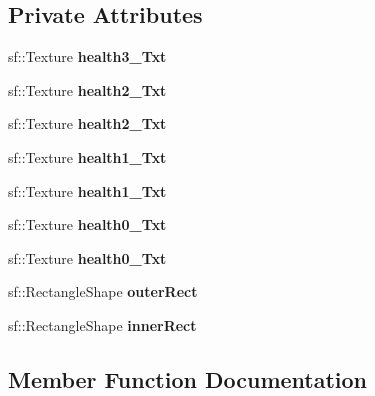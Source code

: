 \subsection*{Private Attributes}
\begin{DoxyCompactItemize}
\item 
\mbox{\label{class_health_system_a3ab0f2f933ddf8574d0814ac7d4c73fc}} 
sf\+::\+Texture {\bfseries health3\+\_\+Txt}
\item 
\mbox{\label{class_health_system_ac003fc2293955dc5b2e27f0b6af93352}} 
sf\+::\+Texture {\bfseries health2\+\_\+Txt}
\item 
\mbox{\label{class_health_system_aa7bf621c91b4117cb051356fef728d40}} 
sf\+::\+Texture {\bfseries health2\+\_\+Txt}
\item 
\mbox{\label{class_health_system_acd0781be4853a6fd3d8973e0b7f70c72}} 
sf\+::\+Texture {\bfseries health1\+\_\+Txt}
\item 
\mbox{\label{class_health_system_ae0839577024e6766584dd4ceb9b9f483}} 
sf\+::\+Texture {\bfseries health1\+\_\+Txt}
\item 
\mbox{\label{class_health_system_a2771af7716d563ad5b9faa79f15fcb66}} 
sf\+::\+Texture {\bfseries health0\+\_\+Txt}
\item 
\mbox{\label{class_health_system_a44205bf34f766aa6dcd6b04f684bd2b5}} 
sf\+::\+Texture {\bfseries health0\+\_\+Txt}
\item 
\mbox{\label{class_health_system_a769daa2b7d445bb5a00bc6ede3db44b4}} 
sf\+::\+Rectangle\+Shape {\bfseries outer\+Rect}
\item 
\mbox{\label{class_health_system_acaa0c164ecfa5ca2bb2b58858f98be35}} 
sf\+::\+Rectangle\+Shape {\bfseries inner\+Rect}
\end{DoxyCompactItemize}


\subsection{Member Function Documentation}
\mbox{\label{class_health_system_ab64ef1ddec39477ac49dcf6390294201}} 

